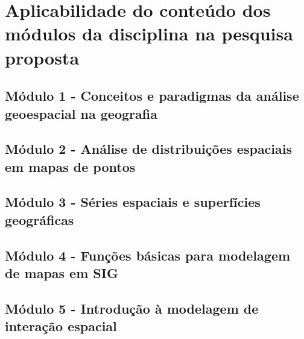 \section{Aplicabilidade do conteúdo dos módulos da disciplina na pesquisa proposta}

\subsection{Módulo 1 - Conceitos e paradigmas da análise geoespacial na geografia}

\subsection{Módulo 2 - Análise de distribuições espaciais em mapas de pontos}

\subsection{Módulo 3 - Séries espaciais e superfícies geográficas}

\subsection{Módulo 4 - Funções básicas para modelagem de mapas em SIG}

\subsection{Módulo 5 - Introdução à modelagem de interação espacial}



